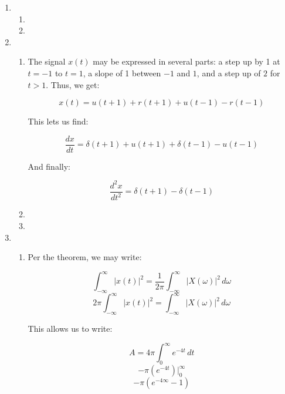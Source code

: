 \begin{enumerate}

  \item

    \begin{enumerate}

      \item 

      \item 

    \end{enumerate}

  \item

    \begin{enumerate}

      \item The signal $x(t)$ may be expressed in several parts: a step up by 1 at $t=-1$ to $t=1$, a slope of 1 between $-1$ and $1$, and a step up of $2$ for $t>1$. Thus, we get:

        $$\boxed{x(t)=u(t+1)+r(t+1)+u(t-1)-r(t-1)}$$

        This lets us find:

        $$\boxed{\frac{dx}{dt}=\delta(t+1)+u(t+1)+\delta(t-1)-u(t-1)}$$

        And finally:

        $$\boxed{\frac{d^2x}{dt^2}=\delta(t+1)-\delta(t-1)}$$

      \item 

      \item 

    \end{enumerate}

    \setcounter{enumi}{3}

  \item

    \begin{enumerate}

      \item Per the theorem, we may write:

        $$\int_{-\infty}^{\infty}|x(t)|^2=\frac{1}{2\pi}\int_{-\infty}^{\infty} |X(\omega)|^2\,d\omega$$
        $$2\pi\int_{-\infty}^{\infty}|x(t)|^2=\int_{-\infty}^{\infty} |X(\omega)|^2\,d\omega$$

        This allows us to write:

        $$A=4\pi\int_{0}^{\infty}e^{-4t}\,dt$$
        $$-\pi \left(e^{-4t}\right)\Big|_0^{\infty}$$
        $$-\pi \left(e^{-4\infty}-1\right)$$


\end{enumerate}
\end{enumerate}
